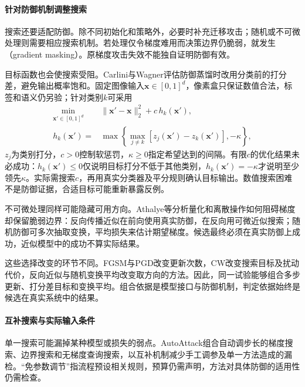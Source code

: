 \paragraph{针对防御机制调整搜索}

搜索还要适配防御。除不同初始化和策略外，必要时补充迁移攻击；随机或不可微处理则需要相应搜索机制。若处理仅令梯度难用而决策边界仍脆弱，就发生（gradient masking）。原梯度攻击失效不能独自证明防御有效。

目标函数也会使搜索受阻。Carlini与Wagner评估防御蒸馏时改用分类前的打分差，避免输出概率饱和。固定图像输入$\bm{x}\in[0,1]^d$，像素盒只保证数值合法，标签和语义仍另验；针对类别$k$可采用
\begin{equation}
 \begin{aligned}
 \min_{\bm{x}'\in[0,1]^d}\quad&
 \|\bm{x}'-\bm{x}\|_2^2+c\,h_k(\bm{x}'),\\
 h_k(\bm{x}')={}&
 \max\left\{\max_{j\ne k}
 [z_j(\bm{x}')-z_k(\bm{x}')],-\kappa\right\},
 \end{aligned}
 \label{eq:security-cw}
\end{equation}
$z_j$为类别打分，$c>0$控制软惩罚，$\kappa\geq0$指定希望达到的间隔。有限$c$的优化结果未必成功：$h_k(\bm{x}')\leq0$仅说明目标打分不低于其他类别，$h_k(\bm{x}')=-\kappa$才说明至少领先$\kappa$。实际需搜索$c$，再用真实分类器及平分规则确认目标输出。数值搜索困难不是防御证据，合适目标可能重新暴露反例。

不可微处理同样可能隐藏可用方向。Athalye等分析量化和离散操作如何阻碍梯度却保留脆弱边界：反向传播近似在前向使用真实防御，在反向用可微近似搜索；随机防御可多次抽取变换，平均损失来估计期望梯度。候选最终必须在真实防御上成功，近似模型中的成功不算实际结果。

这些选择改变的环节不同。FGSM与PGD改变更新次数，CW改变搜索目标及扰动代价，反向近似与随机变换平均改变取方向的方法。因此，同一试验能够组合多步更新、打分差目标和变换平均。组合依据是模型接口与防御机制，判定依据始终是候选在真实系统中的结果。

\paragraph{互补搜索与实际输入条件}

单一搜索可能漏掉某种模型或损失的弱点。AutoAttack组合自动调步长的梯度搜索、边界搜索和无梯度查询搜索，以互补机制减少手工调参及单一方法造成的漏检。“免参数调节”指流程预设相关规则，预算仍需声明，方法对具体防御的适用性仍需检查。

